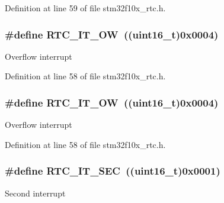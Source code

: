 Definition at line 59 of file stm32f10x\+\_\+rtc.\+h.

\subsubsection[{\texorpdfstring{R\+T\+C\+\_\+\+I\+T\+\_\+\+OW}{RTC_IT_OW}}]{\setlength{\rightskip}{0pt plus 5cm}\#define R\+T\+C\+\_\+\+I\+T\+\_\+\+OW~(({\bf uint16\+\_\+t})0x0004)}\hypertarget{group___r_t_c__interrupts__define_gabcfefb2f22cb8ca65113c2c13d0e0640}{}\label{group___r_t_c__interrupts__define_gabcfefb2f22cb8ca65113c2c13d0e0640}
Overflow interrupt 

Definition at line 58 of file stm32f10x\+\_\+rtc.\+h.

\subsubsection[{\texorpdfstring{R\+T\+C\+\_\+\+I\+T\+\_\+\+OW}{RTC_IT_OW}}]{\setlength{\rightskip}{0pt plus 5cm}\#define R\+T\+C\+\_\+\+I\+T\+\_\+\+OW~(({\bf uint16\+\_\+t})0x0004)}\hypertarget{group___r_t_c__interrupts__define_gabcfefb2f22cb8ca65113c2c13d0e0640}{}\label{group___r_t_c__interrupts__define_gabcfefb2f22cb8ca65113c2c13d0e0640}
Overflow interrupt 

Definition at line 58 of file stm32f10x\+\_\+rtc.\+h.

\subsubsection[{\texorpdfstring{R\+T\+C\+\_\+\+I\+T\+\_\+\+S\+EC}{RTC_IT_SEC}}]{\setlength{\rightskip}{0pt plus 5cm}\#define R\+T\+C\+\_\+\+I\+T\+\_\+\+S\+EC~(({\bf uint16\+\_\+t})0x0001)}\hypertarget{group___r_t_c__interrupts__define_ga960bccbc10da872549cf52c03dd342f1}{}\label{group___r_t_c__interrupts__define_ga960bccbc10da872549cf52c03dd342f1}
Second interrupt 

